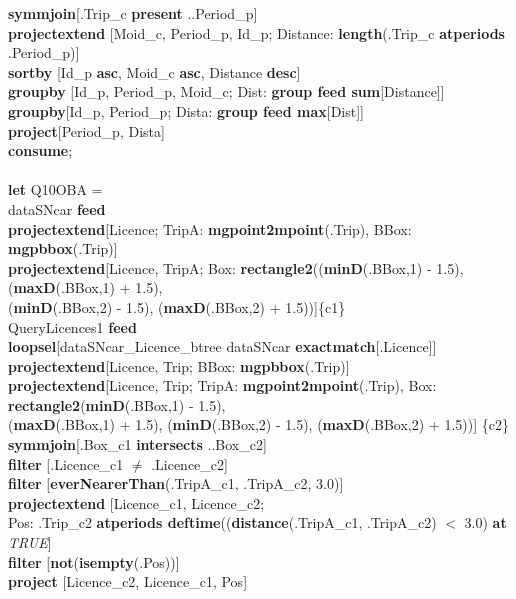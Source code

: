 \documentclass[a4paper]{article}
\newcommand{\op}[1]{\textbf{#1}}
\newcommand{\true}{\textsl{TRUE}}
\begin{document}
\begin{scriptsize}
\begin{tabbing}
\>\op{symmjoin}[.Trip\_c \op{present} ..Period\_p]\\
\>\op{projectextend} [Moid\_c, Period\_p, Id\_p; Distance: \op{length}(.Trip\_c
\op{atperiods} .Period\_p)]\\
\>\op{sortby} [Id\_p \op{asc}, Moid\_c \op{asc}, Distance \op{desc}]\\
\>\op{groupby} [Id\_p, Period\_p, Moid\_c; Dist: \op{group feed
sum}[Distance]]\\
\>\op{groupby}[Id\_p, Period\_p; Dista: \op{group feed max}[Dist]]\\
\>\op{project}[Period\_p, Dista]\\
\op{consume};\\
\\
\op{let} Q10OBA =\\
\>dataSNcar \op{feed}\\
\>\>\op{projectextend}[Licence; TripA: \op{mgpoint2mpoint}(.Trip), BBox:
\op{mgpbbox}(.Trip)]\\
\>\>\op{projectextend}[Licence, TripA; Box: \op{rectangle2}((\op{minD}(.BBox,1)
- 1.5), (\op{maxD}(.BBox,1) + 1.5),\\
\>\>\>\>(\op{minD}(.BBox,2) - 1.5), (\op{maxD}(.BBox,2) + 1.5))]\{c1\}\\
\>QueryLicences1 \op{feed}\\
\>\>\op{loopsel}[dataSNcar\_Licence\_btree dataSNcar
\op{exactmatch}[.Licence]]\\
\>\>\op{projectextend}[Licence, Trip;  BBox: \op{mgpbbox}(.Trip)]\\
\>\>\op{projectextend}[Licence, Trip; TripA: \op{mgpoint2mpoint}(.Trip), Box:
\op{rectangle2}(\op{minD}(.BBox,1) - 1.5),\\
\>\>\>\>(\op{maxD}(.BBox,1) + 1.5), (\op{minD}(.BBox,2) - 1.5),
(\op{maxD}(.BBox,2) + 1.5))] \{c2\}\\
\>\op{symmjoin}[.Box\_c1 \op{intersects} ..Box\_c2]\\
\>\op{filter} [.Licence\_c1 $\neq$ .Licence\_c2]\\
\>\op{filter} [\op{everNearerThan}(.TripA\_c1, .TripA\_c2, 3.0)]\\
\>\op{projectextend} [Licence\_c1, Licence\_c2; \\
\>\>\>\>Pos: .Trip\_c2 \op{atperiods deftime}((\op{distance}(.TripA\_c1,
.TripA\_c2) $<$ 3.0) \op{at} \true{}]\\
\>\op{filter} [\op{not}(\op{isempty}(.Pos))]\\
\>\op{project} [Licence\_c2, Licence\_c1, Pos]\\

\end{tabbing}
\end{scriptsize}
\end{document}
